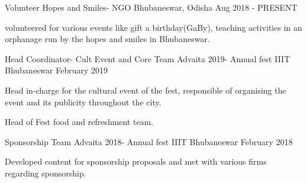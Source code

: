 

\begin{cventries}

  \cventry
    {Volunteer} %
    {Hopes and Smiles- NGO} %
    {Bhubaneswar, Odisha} %
    {Aug 2018 - PRESENT} %
    {
      \begin{cvitems} %
        \item {volunteered for various events like gift a birthday(GaBy), teaching activities in an orphanage run by the hopes and smiles in Bhubaneswar.}
      \end{cvitems}
    }

  \cventry
    {Head Coordinator- Cult Event and Core Team} %
    {Advaita 2019- Annual fest} %
    {IIIT Bhubaneswar} %
    {February 2019} %
    {
      \begin{cvitems} %
        \item {Head in-charge for the cultural event of the fest, responsible of organising the event and its publicity throughout the city. }
        \item {Head of Fest food and refreshment team. }
      \end{cvitems}
    }
  \cventry
    {Sponsorship Team} %
    {Advaita 2018- Annual fest} %
    {IIIT Bhubaneswar} %
    {February 2018} %
    {
      \begin{cvitems} %
        \item {Developed content for sponsorship proposals and met with various firms regarding sponsorship.}
      \end{cvitems}
    }
\end{cventries}
